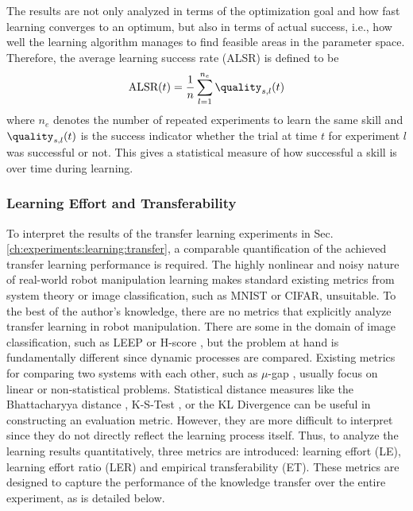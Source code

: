 The results are not only analyzed in terms of the optimization goal and how fast learning converges to an optimum, but also in terms of actual success, i.e., how well the learning algorithm manages to find feasible areas in the parameter space.
Therefore, the average learning success rate (ALSR) is defined to be
\begin{equation}
\text{ALSR}(t)=\frac{1}{n} \sum_{l=1}^{n_e} \quality_{s,l}(t)
\end{equation}
where $n_e$ denotes the number of repeated experiments to learn the same skill and $\quality_{s,l}(t)$ is the success indicator whether the trial at time $t$ for experiment $l$ was successful or not.
This gives a statistical measure of how successful a skill is over time during learning.


\subsubsection{Learning Effort and Transferability}

To interpret the results of the transfer learning experiments in Sec. \ref{ch:experiments:learning:transfer}, a comparable quantification of the achieved transfer learning performance is required.
The highly nonlinear and noisy nature of real-world robot manipulation learning makes standard existing metrics from system theory or image classification, such as MNIST or CIFAR, unsuitable.
To the best of the author's knowledge, there are no metrics that explicitly analyze transfer learning in robot manipulation.
There are some in the domain of image classification, such as LEEP \cite{CuongV.Nguyen.2020} or H-score \cite{YajieBao.2019}, but the problem at hand is fundamentally different since dynamic processes are compared.
Existing metrics for comparing two systems with each other, such as $\mu$-gap \cite{Zhou.1998,MichaelJ.Sorocky.2020}, usually focus on linear or non-statistical problems.
Statistical distance measures like the Bhattacharyya distance \cite{Kailath.1967}, K-S-Test \cite{MasseyJr.1951}, or the KL Divergence \cite{vanErven.2014} can be useful in constructing an evaluation metric.
However, they are more difficult to interpret since they do not directly reflect the learning process itself.
Thus, to analyze the learning results quantitatively, three metrics are introduced: learning effort (LE), learning effort ratio (LER) and empirical transferability (ET).
These metrics are designed to capture the performance of the knowledge transfer over the entire experiment, as is detailed below. 

